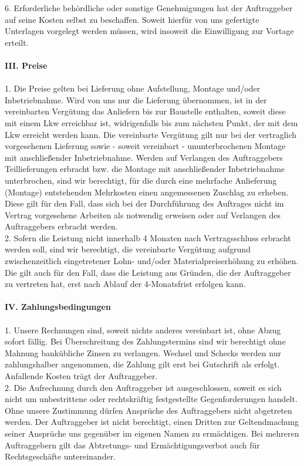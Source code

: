 \documentclass[9pt, oneside]{extletter}
\begin{document}
\begin{multicols}{3}
6. Erforderliche behördliche oder sonstige Genehmigungen hat der Auftraggeber auf seine Kosten selbst zu beschaffen. Soweit hierfür von uns gefertigte Unterlagen vorgelegt werden müssen, wird insoweit die Einwilligung zur Vortage erteilt.\\
\\
\textbf{III. Preise}\\
\\
1. Die Preise gelten bei Lieferung ohne Aufstellung, Montage und/oder Inbetriebnahme. Wird von uns nur die Lieferung übernommen, ist in der vereinbarten Vergütung das Anliefern bis zur Baustelle enthalten, soweit diese mit einem Lkw erreichbar ist, widrigenfalls bis zum nächsten Punkt, der mit dem Lkw erreicht werden kann. Die vereinbarte Vergütung gilt nur bei der vertraglich vorgesehenen Lieferung sowie - soweit vereinbart - ununterbrochenen Montage mit anschließender Inbetriebnahme. Werden auf Verlangen des Auftraggebers Teillieferungen erbracht bzw. die Montage mit anschließender Inbetriebnahme unterbrochen, sind wir berechtigt, für die durch eine mehrfache Anlieferung (Montage) entstehenden Mehrkosten einen angemessenen Zuschlag zu erheben. Diese gilt für den Fall, dass sich bei der Durchführung des Auftrages nicht im Vertrag vorgesehene Arbeiten als notwendig erweisen oder auf Verlangen des Auftraggebers erbracht werden.\\
2. Sofern die Leistung nicht innerhalb 4 Monaten nach Vertragsschluss erbracht werden soll, sind wir berechtigt, die vereinbarte Vergütung aufgrund zwischenzeitlich eingetretener Lohn- und/oder Materialpreiserhöhung zu erhöhen. Die gilt auch für den Fall, dass die Leistung aus Gründen, die der Auftraggeber zu vertreten hat, erst nach Ablauf der 4-Monatsfrist erfolgen kann.\\
\\
\textbf{IV. Zahlungsbedingungen}\\
\\
1. Unsere Rechnungen sind, soweit nichts anderes vereinbart ist, ohne Abzug sofort fällig. Bei Überschreitung des Zahlungstermins sind wir berechtigt ohne Mahnung bankübliche Zinsen zu verlangen. Wechsel und Schecks werden nur zahlungshalber angenommen, die Zahlung gilt erst bei Gutschrift als erfolgt. Anfallende Kosten trägt der Auftraggeber.\\
2. Die Aufrechnung durch den Auftraggeber ist ausgeschlossen, soweit es sich nicht um unbestrittene oder rechtskräftig festgestellte Gegenforderungen handelt. Ohne unsere Zustimmung dürfen Ansprüche des Auftraggebers nicht abgetreten werden. Der Auftraggeber ist nicht berechtigt, einen Dritten zur Geltendmachung seiner Ansprüche uns gegenüber im eigenen Namen zu ermächtigen. Bei mehreren Auftraggebern gilt das Abtretungs- und Ermächtigungsverbot auch für Rechtsgeschäfte untereinander.\\

\end{multicols}
\end{document}
